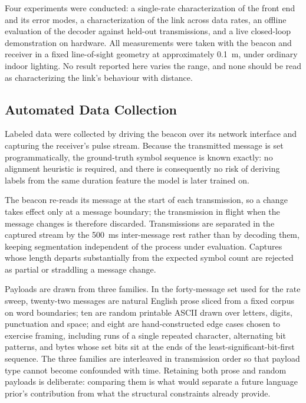 Four experiments were conducted: a single-rate characterization of the
front end and its error modes, a characterization of the link across data
rates, an offline evaluation of the decoder against held-out transmissions, and
a live closed-loop demonstration on hardware. All measurements were taken with
the beacon and receiver in a fixed line-of-sight geometry at approximately
0.1~m, under ordinary indoor lighting. No result reported here varies the
range, and none should be read as characterizing the link's behaviour with
distance.

\subsection{Automated Data Collection}

Labeled data were collected by driving the beacon over its network interface and
capturing the receiver's pulse stream. Because the transmitted message is set
programmatically, the ground-truth symbol sequence is known exactly: no
alignment heuristic is required, and there is consequently no risk of deriving
labels from the same duration feature the model is later trained on.

The beacon re-reads its message at the start of each transmission, so a change
takes effect only at a message boundary; the transmission in flight when the
message changes is therefore discarded. Transmissions are separated in the
captured stream by the 500~ms inter-message rest rather than by decoding them,
keeping segmentation independent of the process under evaluation. Captures whose
length departs substantially from the expected symbol count are rejected as
partial or straddling a message change.

Payloads are drawn from three families. In the forty-message set used for the
rate sweep, twenty-two messages are natural English prose sliced from a fixed
corpus on word boundaries; ten are random printable ASCII drawn over letters,
digits, punctuation and space; and eight are hand-constructed edge cases
chosen to exercise framing, including
runs of a single repeated character, alternating bit patterns, and bytes whose
set bits sit at the ends of the least-significant-bit-first sequence. The three
families are interleaved in transmission order so that payload type cannot
become confounded with time. Retaining both prose and random payloads is
deliberate: comparing them is what would separate a future language prior's
contribution from what the structural constraints already provide.

